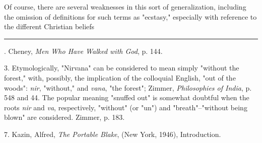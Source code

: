 \hspace*{5mm}Of course, there are several weaknesses in this sort of
generalization, including the omission of definitions for
such terms as "ecstasy," especially with reference to the
different Christian beliefs\linebreak
\null\par
\vspace*{-\baselineskip}
\vspace*{\fill}
\noindent\rule{0.25\textwidth}{0.4pt}\par
[1, 2, 4, 5, 6]. Cheney, \textit{Men Who Have Walked with God}, p. 144.\par
3. Etymologically, "Nirvana" can be considered to mean
simply "without the forest," with, possibly, the implication of
the colloquial English, "out of the woods": \textit{nir},
"without," and \textit{vana}, "the forest"; Zimmer, \textit{Philosophies of India},
p. 548 and 44. The popular meaning "snuffed out" is
somewhat doubtful when the roots \textit{nir} and \textit{va}, respectively,
"without" (or "un") and "breath"--"without being blown" are
considered. Zimmer, p. 183.\par
7. Kazin, Alfred, \textit{The Portable Blake}, (New York, 1946),
Introduction.\par

\newpage


